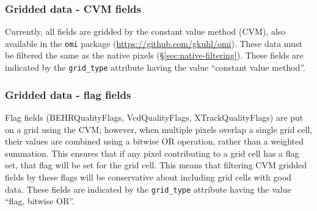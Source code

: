 \documentclass[12pt]{article}
\begin{document}
	
	
	
	
	
	\subsubsection{Gridded data - CVM fields}\label{sec:gridded:cvm}
	Currently, all fields are gridded by the constant value method (CVM), also available in the \lstinline$omi$ package (\url{https://github.com/gkuhl/omi}). These data must be filtered the same as the native pixels (\S\ref{sec:native-filtering}).  These fields are indicated by the \lstinline$grid_type$ attribute having the value ``constant value method''.
	
	\subsubsection{Gridded data - flag fields}
	Flag fields (BEHRQualityFlags, VcdQualityFlags, XTrackQualityFlags) are put on a grid using the CVM; however, when multiple pixels overlap a single grid cell, their values are combined using a bitwise OR operation, rather than a weighted summation. This ensures that if any pixel contributing to a grid cell has a flag set, that flag will be set for the grid cell. This means that filtering CVM gridded fields by these flags will be conservative about including grid cells with good data. These fields are indicated by the \lstinline$grid_type$ attribute having the value ``flag, bitwise OR''.
	
\end{document}
